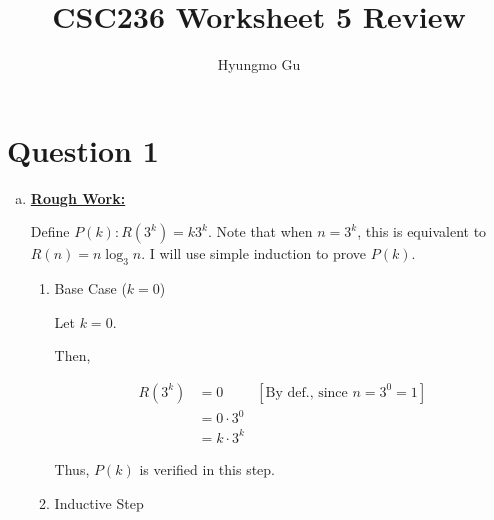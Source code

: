 \documentclass[12pt]{article}
\begin{document}
\title{CSC236 Worksheet 5 Review}
\author{Hyungmo Gu}
\maketitle

\section*{Question 1}
\begin{enumerate}[a.]
    \item

    \begin{mdframed}
        \underline{\textbf{Rough Work:}}

        \bigskip

        Define $P(k): R(3^k) = k3^k$. Note that when $n = 3^k$, this is equivalent
        to $R(n) = n\log_3 n$. I will use simple induction to prove $P(k)$.

        \bigskip

        \begin{enumerate}[1.]
            \item Base Case ($k = 0$)

            \begin{mdframed}
            Let $k = 0$.

            \bigskip

            Then,

            \begin{align}
                R(3^k) &= 0 & [\text{By def., since $n = 3^0 = 1$}]\\
                &= 0 \cdot 3^0\\
                &= k \cdot 3^k
            \end{align}

            \bigskip

            Thus, $P(k)$ is verified in this step.

            \end{mdframed}

            \item Inductive Step
        \end{enumerate}
    \end{mdframed}
\end{enumerate}
\end{document}
